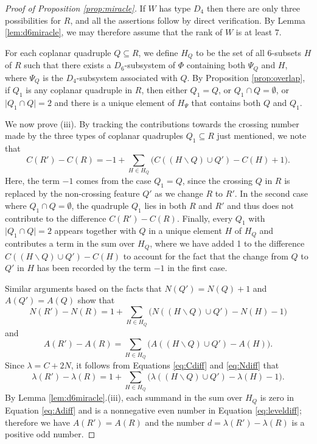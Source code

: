 \documentclass[11pt]{amsart}
\theoremstyle{plain}
\theoremstyle{definition}
\theoremstyle{remark}
\numberwithin{equation}{subsection}
\newcommand{\allroots}{\Phi}
\newcommand{\se}{\subseteq}
\newcommand{\abs}[1]{\lvert #1 \rvert}
\begin{document}
\begin{proof}[Proof of Proposition \ref{prop:miracle}]
If $W$ has type $D_4$ then there are only three possibilities for $R$, and all
the assertions follow by direct verification.  By Lemma \ref{lem:d6miracle}, we
may therefore assume that the rank of $W$ is at least $7$.

For each coplanar quadruple $Q\se R$, we define $H_Q$ to be the set of all
6-subsets $H$ of $R$ such that there exists a $D_6$-subsystem of $\allroots$
containing both $\Psi_Q$ and $H$, where $\Psi_Q$ is the $D_4$-subsystem
associated with $Q$.  By Proposition \ref{prop:overlap}, if $Q_1$ is any
coplanar quadruple in $R$, then either $Q_1=Q$, or $Q_1 \cap Q = \emptyset$, or
$\abs{Q_1\cap Q}=2$ and there is a unique element of $H_\Psi$ that contains both
$Q$ and $Q_1$.

We now prove (iii). By tracking the contributions towards the crossing number
made by the three types of coplanar quadruples $Q_1\se R$ just mentioned, we
note that
\begin{equation}
    \label{eq:Cdiff} C(R') - C(R) = -1 + \sum_{H \in H_Q} \big(C((H \backslash
      Q) \cup Q') - C(H) + 1 \big).
  \end{equation}
Here, the term $-1$ comes from the case $Q_1=Q$, since the crossing $Q$ in $R$
is replaced by the non-crossing feature $Q'$ as we change $R$ to $R'$. In the
second case where $Q_1\cap Q=\emptyset$, the quadruple $Q_1$ lies in both $R$
and $R'$ and thus does not contribute to the difference $C(R')-C(R)$.  Finally,
every $Q_1$ with $\abs{Q_1\cap Q}=2$ appears together with $Q$ in a unique
element $H$ of $H_Q$ and contributes a term in the sum over $H_Q$, where we have
added 1 to the difference $C((H\backslash Q)\cup Q')-C(H)$ to account for the
fact that the change from $Q$ to $Q'$ in $H$ has been recorded by the term $-1$
in the first case.

Similar arguments based on the facts that  $N(Q')=N(Q)+1$ and  $A(Q')=A(Q)$ show
that
\begin{equation}
    \label{eq:Ndiff} N(R') - N(R) = 1 + \sum_{H \in H_Q} \big(N((H \backslash Q)
      \cup Q') - N(H) - 1 \big)
  \end{equation} and
  \begin{equation}
      \label{eq:Adiff} A(R') - A(R) = \sum_{H \in H_Q} \big(A((H \backslash Q)
      \cup Q') - A(H) \big).
  \end{equation} Since $\lambda=C+2N$, it follows from Equations
    \eqref{eq:Cdiff} and \eqref{eq:Ndiff} that
    \begin{equation}
        \label{eq:leveldiff} \lambda(R') - \lambda(R) = 1 + \sum_{H \in H_Q}
      \big(\lambda((H \backslash Q) \cup Q') - \lambda(H) - 1 \big).
  \end{equation}
By Lemma \ref{lem:d6miracle}.(iii), each summand in the sum over $H_Q$ is zero
in Equation \eqref{eq:Adiff} and is a nonnegative even number in Equation
\eqref{eq:leveldiff}; therefore we have $A(R')=A(R)$ and the number
$d=\lambda(R')-\lambda(R)$ is a positive odd number.


\end{proof}
\end{document}
